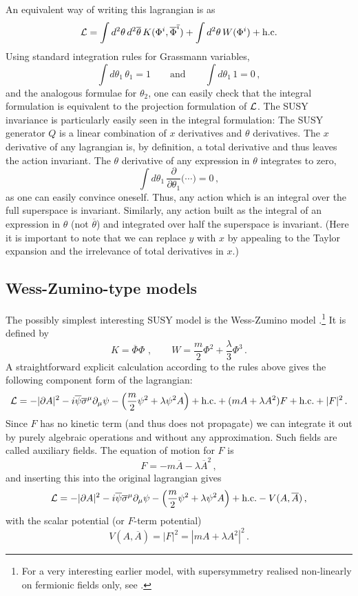 \documentclass[12pt]{article}
\newcommand{\be}{\begin{equation}}
\newcommand{\ee}{\end{equation}}
\newcommand{\ol}{\overline}
\numberwithin{equation}{section}
\begin{document}
An equivalent way of writing this lagrangian is as
\be
{\cal L}=\int d^2\theta\,d^2\ol{\theta}\, K(\Phi^i,\ol{\Phi}^{\ol{\imath}})
+\int d^2\theta\, W(\Phi^i)+\mbox{h.c.}
\ee
Using standard integration rules for Grassmann variables,
\be
\int d \theta_1\,\theta_1=1\qquad \mbox{and}\qquad \int d\theta_1\,1=0\,,
\ee
and the analogous formulae for $\theta_2$, one can easily check that the integral formulation is equivalent to the projection formulation of ${\cal L}$. The SUSY invariance is particularly easily seen in the integral formulation: The SUSY generator $Q$ is a linear combination of $x$ derivatives and $\theta$ derivatives. The $x$ derivative of any lagrangian is, by definition, a total derivative and thus leaves the action invariant. The $\theta$ derivative of any expression in $\theta$ integrates to zero,
\be
\int d\theta_1\,\frac{\partial}{\partial\theta_1}\Big(\cdots\Big)=0\,,
\ee
as one can easily convince oneself. Thus, any action which is an integral over the full superspace is invariant. Similarly, any action built as the integral of an expression in $\theta$ (not $\ol{\theta}$) and integrated over half the superspace is invariant. (Here it is important to note that we can replace $y$ with $x$ by appealing to the Taylor expansion and the irrelevance of total derivatives in $x$.)






\subsection{Wess-Zumino-type models}
The possibly simplest interesting SUSY model is the Wess-Zumino model \cite{Wess:1974tw}.\footnote{For a very interesting earlier model, with supersymmetry realised non-linearly on fermionic fields only, see \cite{Volkov:1973ix}.}
It is defined by 
\be
K=\ol{\Phi}\Phi\,\,,\qquad W=\frac{m}{2}\Phi^2+\frac{\lambda}{3}\Phi^3\,.
\ee
A straightforward explicit calculation according to the rules above gives the following component form of the lagrangian:
\be
{\cal L}=-|\partial A|^2-i\ol{\psi}\ol{\sigma}^\mu\partial_\mu\psi-
\left(\frac{m}{2}\psi^2+\lambda\psi^2A\right)+\mbox{h.c.}+(mA+\lambda A^2)F +\mbox{h.c.}+|F|^2\,.
\ee
Since $F$ has no kinetic term (and thus does not propagate) we can integrate it out by purely algebraic operations and without any approximation. Such fields are called auxiliary fields. The equation of motion for $F$ is
\be
F=-m\ol{A}-\lambda\ol{A}^2\,,
\ee
and inserting this into the original lagrangian gives
\be
{\cal L}=-|\partial A|^2-i\ol{\psi}\ol{\sigma}^\mu\partial_\mu\psi-
\left(\frac{m}{2}\psi^2+\lambda\psi^2A\right)+\mbox{h.c.}-V(A,\ol{A})\,,
\ee
with the scalar potential (or $F$-term potential)
\be
V(A,\ol{A})=|F|^2=|mA+\lambda A^2|^2\,.
\ee
\end{document}
